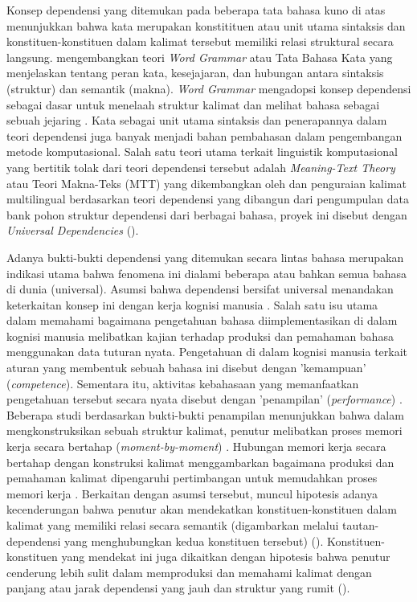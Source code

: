 Konsep dependensi yang ditemukan pada beberapa tata bahasa kuno di atas menunjukkan bahwa kata merupakan konstitituen atau unit utama sintaksis dan konstituen-konstituen dalam kalimat tersebut memiliki relasi struktural secara langsung. \citet{hudson1984word, hudson2007language} mengembangkan teori \textit{Word Grammar} atau Tata Bahasa Kata yang menjelaskan tentang peran kata, kesejajaran, dan hubungan antara sintaksis (struktur) dan semantik (makna). \textit{Word Grammar} mengadopsi konsep dependensi sebagai dasar untuk menelaah struktur kalimat dan melihat bahasa sebagai sebuah jejaring \citep{hudson2007language}. Kata sebagai unit utama sintaksis dan penerapannya dalam teori dependensi juga banyak menjadi bahan pembahasan dalam pengembangan metode komputasional. Salah satu teori utama terkait linguistik komputasional yang bertitik tolak dari teori dependensi tersebut adalah \textit{Meaning-Text Theory} atau Teori Makna-Teks (MTT) yang dikembangkan oleh \cite{mel'vcuk1988dependency} dan penguraian kalimat multilingual berdasarkan teori dependensi yang dibangun dari pengumpulan data bank pohon struktur dependensi dari berbagai bahasa, proyek ini disebut dengan \textit{Universal Dependencies} (\citealp{mcdonald2013universal, nivre2016universal, nivre2017universal}). 

Adanya bukti-bukti dependensi yang ditemukan secara lintas bahasa merupakan indikasi utama bahwa fenomena ini dialami beberapa atau bahkan semua bahasa di dunia (universal). Asumsi bahwa dependensi bersifat universal menandakan keterkaitan konsep ini dengan kerja kognisi manusia \citep{gibson2000dependency}. Salah satu isu utama dalam memahami bagaimana pengetahuan bahasa diimplementasikan di dalam kognisi manusia melibatkan kajian terhadap produksi dan pemahaman bahasa menggunakan data tuturan nyata. Pengetahuan di dalam kognisi manusia terkait aturan yang membentuk sebuah bahasa ini disebut dengan 'kemampuan' (\textit{competence}). Sementara itu, aktivitas kebahasaan yang memanfaatkan pengetahuan tersebut secara nyata disebut dengan 'penampilan' (\textit{performance}) \citep{delahuntygarvey2010soundsense}. Beberapa studi berdasarkan bukti-bukti penampilan menunjukkan bahwa dalam mengkonstruksikan sebuah struktur kalimat, penutur melibatkan proses memori kerja secara bertahap (\textit{moment-by-moment}) \citep{gibson2000dependency}. Hubungan memori kerja secara bertahap dengan konstruksi kalimat menggambarkan bagaimana produksi dan pemahaman kalimat dipengaruhi pertimbangan untuk memudahkan proses memori kerja \citep{futrell2015large}. Berkaitan dengan asumsi tersebut, muncul hipotesis adanya kecenderungan bahwa penutur akan mendekatkan konstituen-konstituen dalam kalimat yang memiliki relasi secara semantik (digambarkan melalui \gls{tautan-dependensi} yang menghubungkan kedua konstituen tersebut) (\citealp{futrell2015large, liu2017dependency}). Konstituen-konstituen yang mendekat ini juga dikaitkan dengan hipotesis bahwa penutur cenderung lebih sulit dalam memproduksi dan memahami kalimat dengan panjang atau jarak dependensi yang jauh dan struktur yang rumit (\citealp{gibson2000dependency, dillon2011structured}).

